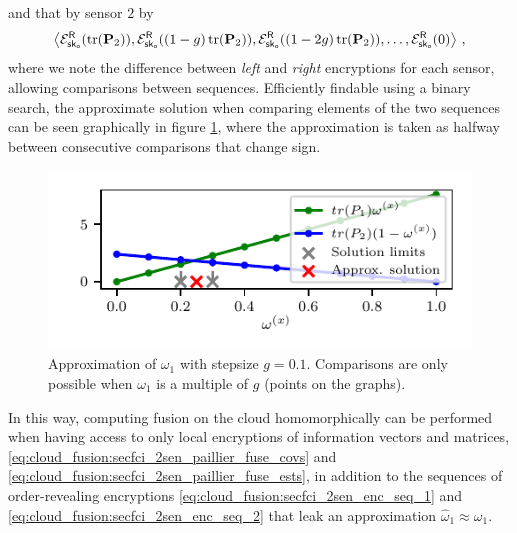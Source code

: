 and that by sensor $2$ by
\begin{equation}\label{eq:cloud_fusion:secfci_2sen_enc_seq_2}
    \left\langle\mathcal{E}^{\mathsf{R}}_{\mathsf{sk}_{\mathsf{o}}}(\operatorname{tr}({{\mathbf{P}}}_2)), \mathcal{E}^{\mathsf{R}}_{\mathsf{sk}_{\mathsf{o}}}((1-g)\operatorname{tr}({{\mathbf{P}}}_2)), \mathcal{E}^{\mathsf{R}}_{\mathsf{sk}_{\mathsf{o}}}((1-2g)\operatorname{tr}({{\mathbf{P}}}_2)),\dots,\mathcal{E}^{\mathsf{R}}_{\mathsf{sk}_{\mathsf{o}}}(0)\right\rangle\,,
\end{equation}
where we note the difference between \textit{left} and \textit{right} encryptions for each sensor, allowing comparisons between sequences. Efficiently findable using a binary search, the approximate solution when comparing elements of the two sequences can be seen graphically in figure \ref{fig:cloud_fusion:secfci_2sen_intersect}, where the approximation is taken as halfway between consecutive comparisons that change sign.
\begin{figure}[htbp]
    \begin{center}
       \includegraphics{figures/2_sensors.pdf}
    \end{center}
    \caption{Approximation of $\omega_1$ with stepsize $g=0.1$. Comparisons are only possible when $\omega_1$ is a multiple of $g$ (points on the graphs).}
    \label{fig:cloud_fusion:secfci_2sen_intersect}
 \end{figure}

In this way, computing fusion on the cloud homomorphically can be performed when having access to only local encryptions of information vectors and matrices, \eqref{eq:cloud_fusion:secfci_2sen_paillier_fuse_covs} and \eqref{eq:cloud_fusion:secfci_2sen_paillier_fuse_ests}, in addition to the sequences of order-revealing encryptions \eqref{eq:cloud_fusion:secfci_2sen_enc_seq_1} and \eqref{eq:cloud_fusion:secfci_2sen_enc_seq_2} that leak an approximation $\hat{\omega}_1 \approx \omega_1$.

